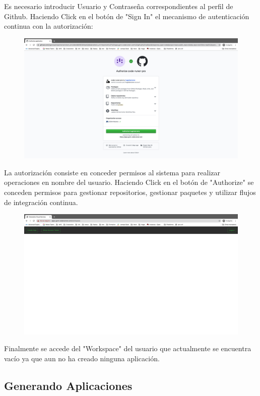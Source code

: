 \documentclass[a4paper,11pt]{book}
\begin{document}
Es necesario introducir Usuario y Contraseña correspondientes al perfil de Github. Haciendo Click en el botón de "Sign In" el mecanismo de autenticación continua con la autorización: 

\begin{figure}[H]
\centering
\includegraphics[scale=0.2]{imagenes/casouso/3.png}
\caption{   }
\end{figure}

La autorización consiste en conceder permisos al sistema para realizar operaciones en nombre del usuario. Haciendo Click en el botón de "Authorize" se conceden permisos para gestionar repositorios, gestionar paquetes y utilizar flujos de integración continua. 

\begin{figure}[H]
\centering
\includegraphics[scale=0.2]{imagenes/casouso/4.png}
\caption{   }
\end{figure}

Finalmente se accede del "Workspace" del usuario que actualmente se encuentra vacío ya que aun no ha creado ninguna aplicación. 

\subsection{Generando Aplicaciones}
\end{document}
